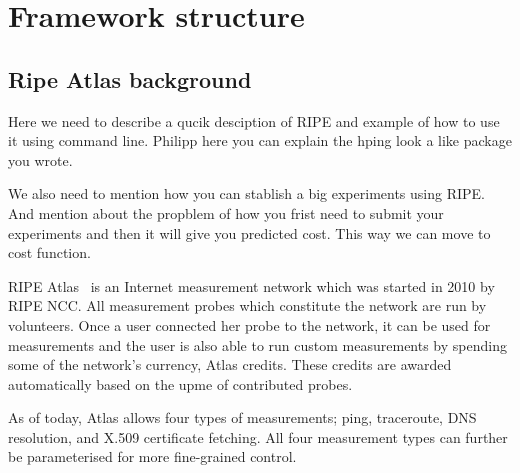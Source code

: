 \section{Framework structure}
\subsection{Ripe Atlas background}
Here we need to describe a qucik desciption of RIPE and example of how to use it using command line. 
Philipp here you can explain the hping look a like package you wrote. 

We also need to mention how you can stablish a big experiments using RIPE. And mention about the propblem of how you frist need to submit your experiments and then it will give you predicted cost. This way we can move to cost function.




RIPE Atlas~\cite{atlas} is an Internet measurement network which was started in 2010 by RIPE NCC.
All measurement probes which constitute the network are run by volunteers.  Once a user connected
her probe to the network, it can be used for measurements and the user is also able to run custom
measurements by spending some of the network's currency, Atlas credits.  These credits are awarded
automatically based on the upme of contributed probes.

As of today, Atlas allows four types of measurements; ping, traceroute, DNS resolution, and X.509
certificate fetching.  All four measurement types can further be parameterised for more fine-grained
control.